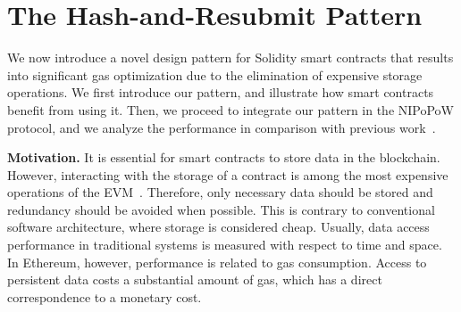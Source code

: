 \section{The Hash-and-Resubmit Pattern}

We now introduce a novel design pattern for Solidity smart contracts that
results into significant gas optimization due to the elimination of expensive
storage operations. We first introduce our pattern, and illustrate how smart
contracts benefit from using it. Then, we proceed to integrate our pattern
in the NIPoPoW protocol, and we analyze the performance in comparison with
previous work~\cite{gglou}.

\noindent
\textbf{Motivation.}
It is essential for smart contracts to store data in the blockchain. However,
interacting with the storage of a contract is among the most expensive
operations of the EVM~\cite{wood,buterin}. Therefore, only necessary data
should be stored and redundancy should be avoided when possible. This is
contrary to conventional software architecture, where storage is considered
cheap. Usually, data access performance in traditional systems is
measured with respect to time and space. In Ethereum, however, performance is related to gas
consumption. Access to persistent data costs a substantial amount of gas, which
has a direct correspondence to a monetary cost.


